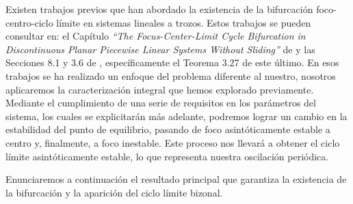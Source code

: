 \documentclass[12pt,a4paper]{report} %
\begin{document}
	Existen trabajos previos que han abordado la existencia de la bifurcación foco-centro-ciclo límite en sistemas lineales a trozos. Estos trabajos se pueden consultar en: el Capítulo \textit{``The Focus-Center-Limit Cycle Bifurcation in Discontinuous Planar Piecewise Linear
	Systems Without Sliding''} de \cite{ciclolimite} y las Secciones 8.1 y 3.6 de \cite{amarillo}, específicamente el Teorema 3.27 de este último. En esos trabajos se ha realizado un enfoque del problema diferente al nuestro, nosotros aplicaremos la caracterización integral que hemos explorado previamente. Mediante el cumplimiento de una serie de requisitos en los parámetros del sistema, los cuales se explicitarán más adelante, podremos lograr un cambio en la estabilidad del punto de equilibrio, pasando de foco asintóticamente estable a centro y, finalmente, a foco inestable. Este proceso nos llevará a obtener el ciclo límite asintóticamente estable, lo que representa nuestra oscilación periódica.
	
	\vspace{0.5cm} Enunciaremos a continuación el resultado principal que garantiza la existencia de la bifurcación y la aparición del ciclo límite bizonal.
	
\end{document}
